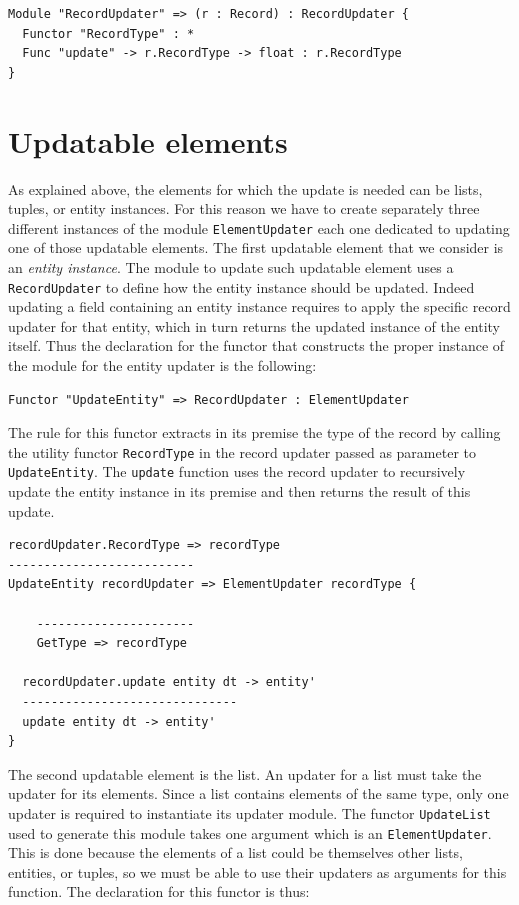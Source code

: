 \begin{lstlisting}
Module "RecordUpdater" => (r : Record) : RecordUpdater {
  Functor "RecordType" : *
  Func "update" -> r.RecordType -> float : r.RecordType
}
\end{lstlisting}

\section{Updatable elements}
\label{subsec:ch_networking_updatable_elements}
As explained above, the elements for which the update is needed can be lists, tuples, or entity instances. For this reason we have to create separately three different instances of the module \texttt{ElementUpdater} each one dedicated to updating one of those updatable elements. The first updatable element that we consider is an \textit{entity instance}. The module to update such updatable element uses a \texttt{RecordUpdater} to define how the entity instance should be updated. Indeed updating a field containing an entity instance requires to apply the specific record updater for that entity, which in turn returns the updated instance of the entity itself. Thus the declaration for the functor that constructs the proper instance of the module for the entity updater is the following:

\begin{lstlisting}
Functor "UpdateEntity" => RecordUpdater : ElementUpdater
\end{lstlisting}

\noindent
The rule for this functor extracts in its premise the type of the record by calling the utility functor \texttt{RecordType} in the record updater passed as parameter to \texttt{UpdateEntity}. The \texttt{update} function uses the record updater to recursively update the entity instance in its premise and then returns the result of this update.

\begin{lstlisting}
recordUpdater.RecordType => recordType
--------------------------
UpdateEntity recordUpdater => ElementUpdater recordType {

	----------------------
	GetType => recordType
 
  recordUpdater.update entity dt -> entity'
  ------------------------------
  update entity dt -> entity'
}
\end{lstlisting}

\noindent
The second updatable element is the list. An updater for a list must take the updater for its elements. Since a list contains elements of the same type, only one updater is required to instantiate its updater module. The functor \texttt{UpdateList} used to generate this module takes one argument which is an \texttt{ElementUpdater}. This is done because the elements of a list could be themselves other lists, entities, or tuples, so we must be able to use their updaters as arguments for this function. The declaration for this functor is thus:


